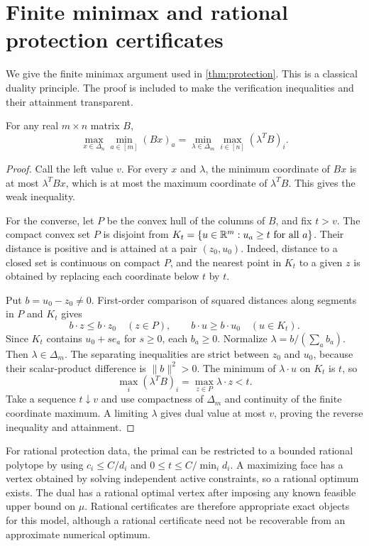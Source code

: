 \section{Finite minimax and rational protection certificates}
\label{app:minimax}
We give the finite minimax argument used in \cref{thm:protection}. This is a classical duality principle. The proof is included to make the verification inequalities and their attainment transparent.

\begin{lemma}
For any real $m\times n$ matrix $B$,
\[
\max_{x\in\Delta_n}\min_{a\in[m]}(Bx)_a
=\min_{\lambda\in\Delta_m}\max_{i\in[n]}(\lambda^TB)_i.
\]
\end{lemma}
\begin{proof}
Call the left value $v$. For every $x$ and $\lambda$, the minimum coordinate of $Bx$ is at most $\lambda^TBx$, which is at most the maximum coordinate of $\lambda^TB$. This gives the weak inequality.

For the converse, let $P$ be the convex hull of the columns of $B$, and fix $t>v$. The compact convex set $P$ is disjoint from $K_t=\{u\in\mathbb R^m:u_a\ge t\text{ for all }a\}$. Their distance is positive and is attained at a pair $(z_0,u_0)$. Indeed, distance to a closed set is continuous on compact $P$, and the nearest point in $K_t$ to a given $z$ is obtained by replacing each coordinate below $t$ by $t$.

Put $b=u_0-z_0\ne0$. First-order comparison of squared distances along segments in $P$ and $K_t$ gives
\[
b\cdot z\le b\cdot z_0\quad(z\in P),\qquad
b\cdot u\ge b\cdot u_0\quad(u\in K_t).
\]
Since $K_t$ contains $u_0+s e_a$ for $s\ge0$, each $b_a\ge0$. Normalize $\lambda=b/(\sum_a b_a)$. Then $\lambda\in\Delta_m$. The separating inequalities are strict between $z_0$ and $u_0$, because their scalar-product difference is $\|b\|^2>0$. The minimum of $\lambda\cdot u$ on $K_t$ is $t$, so
\[
\max_i(\lambda^TB)_i=\max_{z\in P}\lambda\cdot z<t.
\]
Take a sequence $t\downarrow v$ and use compactness of $\Delta_m$ and continuity of the finite coordinate maximum. A limiting $\lambda$ gives dual value at most $v$, proving the reverse inequality and attainment.
\end{proof}

For rational protection data, the primal can be restricted to a bounded rational polytope by using $c_i\le C/d_i$ and $0\le t\le C/\min_i d_i$. A maximizing face has a vertex obtained by solving independent active constraints, so a rational optimum exists. The dual has a rational optimal vertex after imposing any known feasible upper bound on $\mu$. Rational certificates are therefore appropriate exact objects for this model, although a rational certificate need not be recoverable from an approximate numerical optimum.

